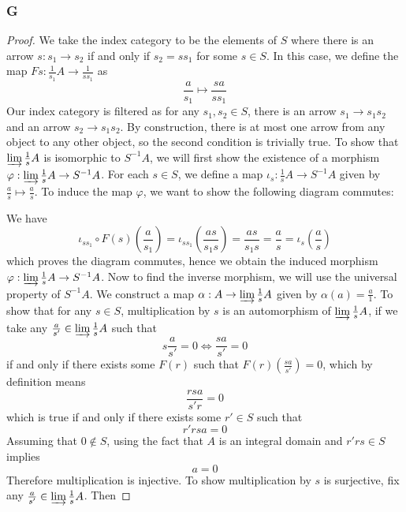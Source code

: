 \documentclass{article}
\begin{document}
\subsubsection{G}\label{1.4.G}
\begin{proof}
    We take the index category to be the elements of $S$ where there is an arrow $s:s_1\to s_2$ if and only if $s_2=ss_1$ for some $s\in S$. In this case, we define the map $Fs:\frac{1}{s_1}A\to \frac{1}{ss_1}$ as
    \[
    \frac{a}{s_1}\mapsto \frac{sa}{ss_1}
    \]
    Our index category is filtered as for any $s_1,s_2\in S$, there is an arrow $s_1\to s_1s_2$ and an arrow $s_2\to s_1s_2$. By construction, there is at most one arrow from any object to any other object, so the second condition is trivially true. To show that $\varinjlim \frac{1}{s}A$ is isomorphic to $S^{-1}A$, we will first show the existence of a morphism $\varphi:\varinjlim \frac{1}{s}A\to S^{-1}A$. For each $s\in S$, we define a map $\iota_s: \frac{1}{s}A\to S^{-1}A$ given by $\frac{a}{s}\mapsto \frac{a}{s}$. To induce the map $\varphi$, we want to show the following diagram commutes:
    \begin{center}
    \end{center}
    We have
    \[
    \iota_{ss_1}\circ F(s)(\frac{a}{s_1})=\iota_{ss_1}(\frac{as}{s_1s})=\frac{as}{s_1s}=\frac{a}{s}=\iota_s(\frac{a}{s})
    \]
    which proves the diagram commutes, hence we obtain the induced morphism $\varphi:\varinjlim \frac{1}{s}A\to S^{-1}A$. Now to find the inverse morphism, we will use the universal property of $S^{-1}A$. We construct a map $\alpha:A\to \varinjlim \frac{1}{s}A$ given by $\alpha(a)=\frac{a}{1}$. To show that for any $s\in S$, multiplication by $s$ is an automorphism of $\varinjlim \frac{1}{s}A$, if we take any $\frac{a}{s'}\in \varinjlim \frac{1}{s}A$ such that\[
    s\frac{a}{s'}=0\iff
    \frac{sa}{s'}=0
    \]
    if and only if there exists some $F(r)$ such that $F(r)(\frac{sa}{s'})=0$, which by definition means
    \[
    \frac{rsa}{s'r}=0
    \]
    which is true if and only if there exists some $r'\in S$ such that
    \[
    r'rsa=0
    \]
    Assuming that $0\notin S$, using the fact that $A$ is an integral domain and $r'rs\in S$ implies
    \[
    a=0
    \]
   Therefore multiplication is injective. To show multiplication by $s$ is surjective, fix any $\frac{a}{s'}\in \varinjlim \frac{1}{s}A$. Then

\end{proof}
\end{document}
